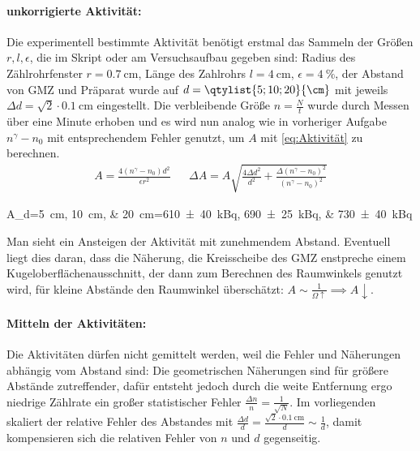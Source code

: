 \paragraph{unkorrigierte Aktivität:} Die experimentell bestimmte Aktivität benötigt erstmal das Sammeln der Größen \(r,l,\epsilon\), die im Skript\autocite{Skript_2.2} oder am Versuchsaufbau gegeben sind: Radius des Zählrohrfenster \(r=\qty{0.7}{\cm}\), Länge des Zahlrohrs \(l=\qty{4}{\cm}\), \(\epsilon=\qty{4}{\percent}\), der Abstand von GMZ und Präparat wurde auf \(d=\qtylist{5;10;20}{\cm}\) mit jeweils \(\Delta d=\sqrt{2}\cdot\qty{0.1}{\cm}\) eingestellt. Die verbleibende Größe \(n=\frac{N}{t}\) wurde durch Messen über eine Minute erhoben und es wird nun analog wie in vorheriger Aufgabe \(n^\gamma-n_0\) mit entsprechendem Fehler genutzt, um \(A\) mit \cref{eq:Aktivität} zu berechnen.
\begin{align}
    A=\frac{4(n^\gamma-n_0)d^2}{\epsilon r^2}&&\Delta A=A\sqrt{\frac{4 \Delta{d}^{2}}{d^{2}} + \frac{\Delta{(n^\gamma-n_0)}^{2}}{(n^\gamma-n_0)^{2}}}
\end{align}
\begin{rbl}
    A_{d=\qtylist{5;10;20}{\cm}}=\qtylist{610(40);690(25);730(40)}{\kilo\becquerel}
\end{rbl}
Man sieht ein Ansteigen der Aktivität mit zunehmendem Abstand. Eventuell liegt dies daran, dass die Näherung, die Kreisscheibe des GMZ enstpreche einem Kugeloberflächenausschnitt, der dann zum Berechnen des Raumwinkels genutzt wird, für kleine Abstände den Raumwinkel überschätzt: \(A\sim\frac{1}{\Omega\uparrow}\implies A \downarrow\). 

\paragraph{Mitteln der Aktivitäten:} Die Aktivitäten dürfen nicht gemittelt werden, weil die Fehler und Näherungen abhängig vom Abstand sind: Die geometrischen Näherungen sind für größere Abstände zutreffender, dafür entsteht jedoch durch die weite Entfernung ergo niedrige Zählrate ein großer statistischer Fehler \(\frac{\Delta n}{n}=\frac{1}{\sqrt{N}}\). Im vorliegenden skaliert der relative Fehler des Abstandes mit \(\frac{\Delta d}{d}=\frac{\sqrt{2}\cdot\qty{0.1}{\cm}}{d}\sim\frac{1}{d}\), damit kompensieren sich die relativen Fehler von \(n\) und \(d\) gegenseitig. 

